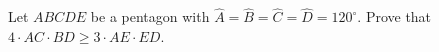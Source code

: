 Let $ABCDE$ be a pentagon with $\hat{A}=\hat{B}=\hat{C}=\hat{D}=120^{\circ}$. Prove that $4\cdot AC \cdot BD\geq 3\cdot AE \cdot ED$.